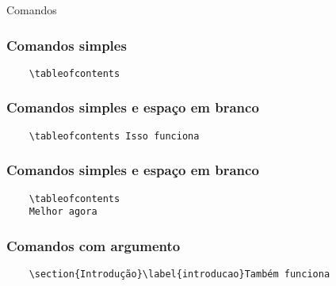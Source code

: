 \begin{frame}[standout]
  \Huge
  Comandos
\end{frame}

\begin{frame}[fragile]
  \frametitle{Comandos simples}
  \begin{verbatim}
    \tableofcontents
  \end{verbatim}
\end{frame}

\begin{frame}[fragile]
  \frametitle{Comandos simples e espaço em branco}
  \begin{verbatim}
    \tableofcontents Isso funciona
  \end{verbatim}
\end{frame}

\begin{frame}[fragile]
  \frametitle{Comandos simples e espaço em branco}
  \begin{verbatim}
    \tableofcontents
    Melhor agora
  \end{verbatim}
\end{frame}

\begin{frame}[fragile]
  \frametitle{Comandos com argumento}
  \begin{verbatim}
    \section{Introdução}\label{introducao}Também funciona
  \end{verbatim}
\end{frame}

\begin{frame}[standout]
  \Huge
\end{frame}
